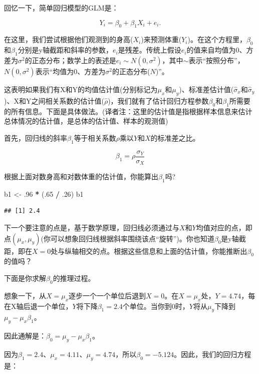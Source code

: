 \documentclass[
]{book}
\newenvironment{Shaded}{\begin{snugshade}}{\end{snugshade}}
\newcommand{\DecValTok}[1]{\textcolor[rgb]{0.00,0.00,0.81}{#1}}
\newcommand{\NormalTok}[1]{#1}
\newcommand{\OtherTok}[1]{\textcolor[rgb]{0.56,0.35,0.01}{#1}}
\newcommand{\SpecialCharTok}[1]{\textcolor[rgb]{0.81,0.36,0.00}{\textbf{#1}}}
\begin{document}
回忆一下，简单回归模型的GLM是：

\[Y_i = \beta_0 + \beta_1 X_i + e_i.\]

在这里，我们尝试根据他们观测到的身高(\(X_i\))来预测体重(\(Y_i\))。在这个方程里，\(\beta_0\)和\(\beta_1\)分别是y轴截距和斜率的参数，\(e_i\)是残差。传统上假设\(e_i\)的值来自均值为0、方差为\(\sigma^2\)的正态分布；数学上的表述是\(e_i \sim N(0, \sigma^2)\)，其中\(\sim\)表示``按照分布''，\(N(0, \sigma^2)\)表示``均值为0、方差为\(\sigma^2\)的正态分布(\(N\))''。

这表明如果我们有X和Y的均值估计值(分别标记为\(\mu_x\)和\(\mu_y\))、标准差估计值(\(\hat{\sigma}_x\)和\(\hat{\sigma}_y\))、X和Y之间相关系数的估计值(\(\hat{\rho}\))，我们就有了估计回归方程参数\(\beta_0\)和\(\beta_1\)所需要的所有信息。下面是具体做法。(译者注：这里的估计值是指根据样本信息来估计总体情况的估计值，是总体的估计值、样本的观测值)

首先，回归线的斜率\(\beta_1\)等于相关系数\(\rho\)乘以\(Y\)和\(X\)的标准差之比。

\[\beta_1 = \rho \frac{\sigma_Y}{\sigma_X}\]

根据上面对数身高和对数体重的估计值，你能算出\(\beta_1\)吗?

\begin{Shaded}
\begin{Highlighting}[]
\NormalTok{b1 }\OtherTok{\textless{}{-}}\NormalTok{ .}\DecValTok{96} \SpecialCharTok{*}\NormalTok{ (.}\DecValTok{65} \SpecialCharTok{/}\NormalTok{ .}\DecValTok{26}\NormalTok{)}
\NormalTok{b1}
\end{Highlighting}
\end{Shaded}

\begin{verbatim}
## [1] 2.4
\end{verbatim}

下一个要注意的点是，基于数学原理，回归线必须通过与\(X\)和\(Y\)均值对应的点，即点\((\mu_x, \mu_y)\)(你可以想象回归线根据斜率围绕该点``旋转'')。你也知道\(\beta_0\)是y轴截距，即在\(X = 0\)处与纵轴相交的点。根据这些信息和上面的估计值，你能推断出\(\beta_0\)的值吗？

下面是你求解\(\beta_0\)的推理过程。

想象一下，从\(X = \mu_x\)逐步一个一个单位后退到\(X = 0\)。在\(X = \mu_x\)处，\(Y = 4.74\)，每在X轴后退一个单位，\(Y\)将下降\(\beta_1 = 2.4\)个单位。当你到0时，\(Y\)将从\(\mu_y\)下降到\(\mu_y - \mu_x \beta_1\)。

因此通解是：\(\beta_0 = \mu_y - \mu_x\beta_1\)。

因为\(\beta_1 = 2.4\)、\(\mu_x = 4.11\)、\(\mu_y = 4.74\)，所以\(\beta_0 = -5.124\)。因此，我们的回归方程是：
\end{document}
